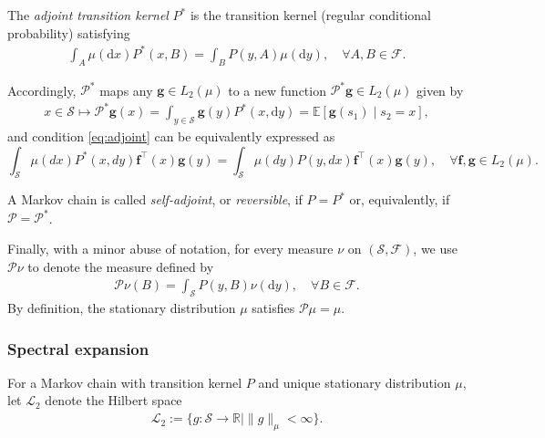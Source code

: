 The \emph{adjoint transition kernel} $P^*$ is the transition kernel (regular conditional probability) satisfying 
\begin{align*}
\int_{A }\mu(\mathrm{d}x) P^*(x,B) = \int_{B } P(y,A) \mu(\mathrm{d}y), \quad \forall A, B \in \mathcal{F}.
\end{align*}

Accordingly, $\mathcal{P}^*$ maps any $\bm{g} \in L_2(\mu)$ to a new function $\mathcal{P}^* \bm{g} \in L_2(\mu)$ given by
\begin{align*}
x \in \mathcal{S} \mapsto \mathcal{P}^*\bm{g}(x) = \int_{y \in \mathcal{S}} \bm{g}(y)P^*(x,\mathrm{d}y) = \mathbb{E}[\bm{g}(s_1)\mid s_2 = x],
\end{align*}
and condition \eqref{eq:adjoint} can be equivalently expressed as
\[
\int_{\mathcal{S}} \mu(dx)P^*(x,dy)  \bm{f}^\top(x)  \bm{g}(y) = \int_{\mathcal{S}} \mu(dy) P(y,dx) \bm{f}^\top(x)  \bm{g}(y), \quad \forall \bm{f}, \bm{g} \in L_2(\mu).
\]


A Markov chain is called \emph{self-adjoint}, or \emph{reversible}, if $P = P^*$ or, equivalently, if $\mathcal{P} = \mathcal{P}^*$.



Finally, with a minor abuse of notation, for every measure $\nu$ on $(\mathcal{S},\mathscr{F})$, we use $\mathcal{P}\nu$ to denote the measure defined by
\begin{align*}
\mathcal{P}\nu(B) = \int_{\mathcal{S}} P(y,B)\nu(\mathrm{d}y), \quad \forall B \in \mathcal{F}.
\end{align*}
By definition, the stationary distribution $\mu$ satisfies $\mathcal{P}\mu = \mu$.

\subsubsection{Spectral expansion}
For a Markov chain with transition kernel $P$ and unique stationary distribution $\mu$, let $\mathcal{L}_2$ denote the Hilbert space
\begin{align*}
\mathcal{L}_2:= \{g:\mathcal{S} \to \mathbb{R} \mid \|g\|_{\mu} < \infty\}. 
\end{align*}

